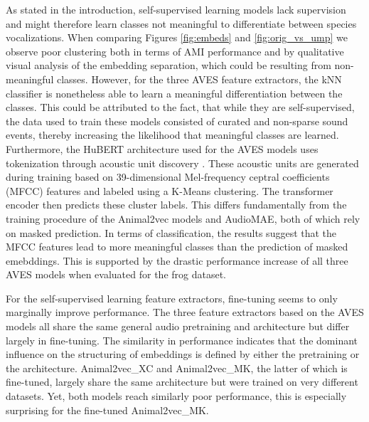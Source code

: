 As stated in the introduction, self-supervised learning models lack supervision and might therefore learn classes not meaningful to differentiate between species vocalizations.
When comparing Figures \ref{fig:embeds} and \ref{fig:orig_vs_ump} we observe poor clustering both in terms of AMI performance and by qualitative visual analysis of the embedding separation, which could be resulting from non-meaningful classes.
However, for the three AVES feature extractors, the kNN classifier is nonetheless able to learn a meaningful differentiation between the classes.
This could be attributed to the fact, that while they are self-supervised, the data used to train these models consisted of curated and non-sparse sound events, thereby increasing the likelihood that meaningful classes are learned.
Furthermore, the HuBERT architecture used for the AVES models uses tokenization through acoustic unit discovery \cite{hagiwara_aves_2022}.
These acoustic units are generated during training based on 39-dimensional Mel-frequency ceptral coefficients (MFCC) features and labeled using a K-Means clustering.
The transformer encoder then predicts these cluster labels.
This differs fundamentally from the training procedure of the Animal2vec models and AudioMAE, both of which rely on masked prediction.
In terms of classification, the results suggest that the MFCC features lead to more meaningful classes than the prediction of masked emebddings.
This is supported by the drastic performance increase of all three AVES models when evaluated for the frog dataset.

For the self-supervised learning feature extractors, fine-tuning seems to only marginally improve performance.
The three feature extractors based on the AVES models all share the same general audio pretraining and architecture but differ largely in fine-tuning. 
The similarity in performance indicates that the dominant influence on the structuring of embeddings is defined by either the pretraining or the architecture.
Animal2vec\_XC and Animal2vec\_MK, the latter of which is fine-tuned, largely share the same architecture but were trained on very different datasets.
Yet, both models reach similarly poor performance, this is especially surprising for the fine-tuned Animal2vec\_MK.



